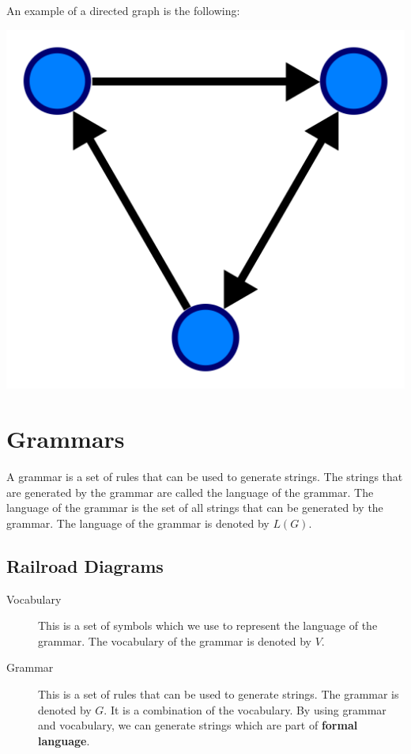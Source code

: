 \documentclass[11pt]{article}
\begin{document}
An example of a directed graph is the following:

\begin{center}
\includegraphics[width=.9\linewidth]{Directed_Graphs/2022-12-06_17-07-14_1024px-Directed.svg.png}
\end{center}

\section{Grammars}
\label{sec:org4b532d9}
A grammar is a set of rules that can be used to generate strings. The strings that are generated by the grammar are called the language of the grammar. The language of the grammar is the set of all strings that can be generated by the grammar. The language of the grammar is denoted by \(L(G)\).

\subsection{Railroad Diagrams}
\label{sec:orgf146329}


\begin{description}
\item[{Vocabulary}] This is a set of symbols which we use to represent the language of the grammar. The vocabulary of the grammar is denoted by \(V\).
\item[{Grammar}] This is a set of rules that can be used to generate strings. The grammar is denoted by \(G\). It is a combination of the vocabulary. By using grammar and vocabulary, we can generate strings which are part of \textbf{formal language}.
\end{description}
\end{document}
